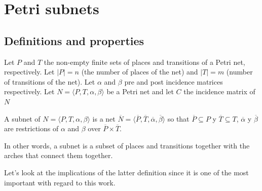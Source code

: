 
\chapter{Petri subnets} %

\label{Chapter2} %



\section{Definitions and properties}

Let $ P $ and $ T $ the non-empty finite sets of places and
transitions of a Petri net, respectively. Let $ | P | = n $ (the number of places
of the net) and $ | T | = m $ (number of transitions of the net). Let $ \alpha $ and $ \beta $ pre and post incidence matrices respectively. Let $ N = \langle P, T, \alpha, \beta \rangle $ be a
Petri net and let $ C $ the incidence matrix of $ N $

\begin{definition}
A subnet of $N=\langle P,T,\alpha,\beta\rangle$
is a net $\overline{N}=\langle\overline{P},\overline{T},\overline{\alpha},\overline{\beta}\rangle$
so that $\overline{P}\subseteq P$ y $\overline{T}\subseteq T$, $\overline{\alpha}$
y $\overline{\beta}$ are restrictions of $\alpha$ and $\beta$ over
$\overline{P}\times\overline{T}$.
\end{definition}
In other words, a subnet is a subset of places and transitions
together with the arches that connect them together.

Let's look at the implications of the latter definition
since it is one of the most important with regard to this work.

